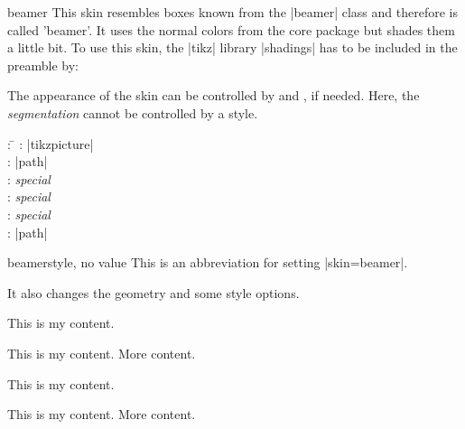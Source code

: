 \begin{docSkin}{beamer}
  This skin resembles boxes known from the |beamer| class and therefore is
  called 'beamer'. It uses the normal colors from the core package but shades
  them a little bit. To use this skin, the |tikz| library |shadings|
  has to be included in the preamble by:
\begin{dispListing}
\usetikzlibrary{shadings}
\end{dispListing}
The appearance of the skin can be controlled by 
and , if needed. Here, the \emph{segmentation}
cannot be controlled by a style.
\begin{tcolorbox}[skintable=beamer]
  \begin{tabbing}
    : \=\kill
    :  \> |tikzpicture|\\ 
    :           \> |path|\\
    : \> \emph{special}\\ 
    :        \> \emph{special}\\
    :    \> \emph{special}\\
    :           \> |path|
  \end{tabbing}
\end{tcolorbox}
\end{docSkin}



\begin{docTcbKey}{beamer}{}{style, no value}
  This is an abbreviation for setting |skin=beamer|.
  \begin{marker}It also changes the geometry and some style options.\end{marker}
\end{docTcbKey}



\begin{dispExample}
\begin{tcbraster}[beamer,raster equal height,raster columns=4,
    colback=LightGreen,colframe=DarkGreen,
    left=1mm,right=1mm,top=1mm,bottom=1mm,middle=1mm]
  \begin{tcolorbox}
    This is my content.
  \end{tcolorbox}
  \begin{tcolorbox}
    This is my content.
    \tcblower
    More content.
  \end{tcolorbox}
  \begin{tcolorbox}[adjusted title=My title]
    This is my content.
  \end{tcolorbox}
  \begin{tcolorbox}[adjusted title=My title]
    This is my content.
    \tcblower
    More content.
  \end{tcolorbox}
\end{tcbraster}
\end{dispExample}



